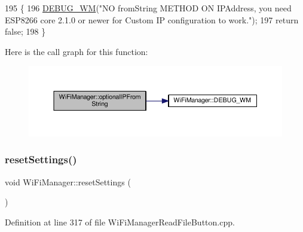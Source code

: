 \begin{DoxyCode}
195                                            \{
196       \hyperlink{class_wi_fi_manager_ae5f595c670ccbcf9a191baf50f5c7c26}{DEBUG\_WM}(\textcolor{stringliteral}{"NO fromString METHOD ON IPAddress, you need ESP8266 core 2.1.0 or newer for Custom
       IP configuration to work."});
197       \textcolor{keywordflow}{return} \textcolor{keyword}{false};
198     \}
\end{DoxyCode}
Here is the call graph for this function\+:\nopagebreak
\begin{figure}[H]
\begin{center}
\leavevmode
\includegraphics[width=350pt]{d4/dc8/class_wi_fi_manager_aa248b818eee0423b14a88c637f7c4637_cgraph}
\end{center}
\end{figure}
\mbox{\label{class_wi_fi_manager_a0027749816b6c66bc845d7c5db760a33}} 
\subsubsection{\texorpdfstring{reset\+Settings()}{resetSettings()}}
{\footnotesize\ttfamily void Wi\+Fi\+Manager\+::reset\+Settings (\begin{DoxyParamCaption}{ }\end{DoxyParamCaption})}



Definition at line 317 of file Wi\+Fi\+Manager\+Read\+File\+Button.\+cpp.


